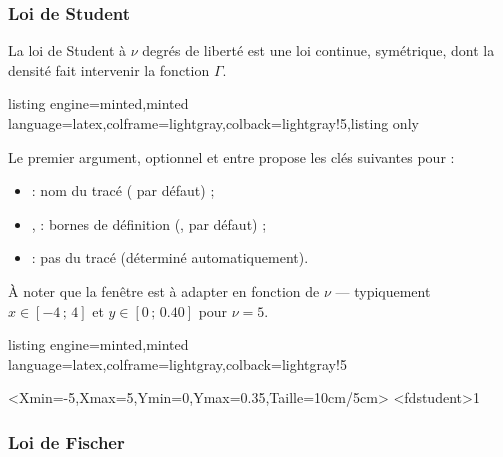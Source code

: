 \documentclass[11pt,a4paper]{ltxdoc}
\begin{document}
\subsubsection{Loi de Student}\label{loistudent}

La loi de Student à $\nu$ degrés de liberté est une loi continue, symétrique, dont la densité fait intervenir la fonction $\Gamma$.

\begin{tcblisting}{listing engine=minted,minted language=latex,colframe=lightgray,colback=lightgray!5,listing only}
\end{tcblisting}

Le premier argument, optionnel et entre \MontreCode{[...]} propose les clés suivantes pour  :

\begin{itemize}
  \item {} : nom du tracé ( par défaut) ;
  \item {},  : bornes de définition (,  par défaut) ;
  \item {} : pas du tracé (déterminé automatiquement).
\end{itemize}

À noter que la fenêtre est à adapter en fonction de $\nu$ — typiquement $x \in [-4\,;\,4]$ et $y \in [0\,;\,0.40]$ pour $\nu=5$.

\begin{tcblisting}{listing engine=minted,minted language=latex,colframe=lightgray,colback=lightgray!5}
\begin{GraphiqueTikz}%
    [Xgrille=1,Xgrilles=0.5,Ygrille=0.1,Ygrilles=0.05]%
    <Xmin=-5,Xmax=5,Ymin=0,Ymax=0.35,Taille={10cm/5cm}>
  \TracerAxesGrilles[Elargir=2.5mm,Dernier,Derriere]{}{}
  \DefinirLoiStudent[]<fdstudent>{1}
\end{GraphiqueTikz}
\end{tcblisting}

\subsubsection{Loi de Fischer}\label{loifischer}
\end{document}
